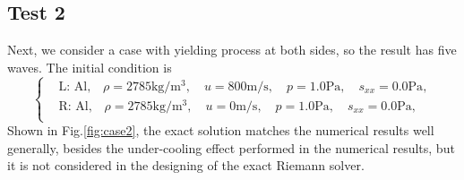 \documentclass{article}
\numberwithin{equation}{section}
\numberwithin{table}{section}
\begin{document}
\subsection{Test 2}
Next, we consider a case with yielding process at both sides, so the result has five waves. The initial condition is
\begin{equation}
 \left\{ \begin{aligned}
	 &	 \text{L: Al,}\quad  \rho = 2785 \text{kg}/\text{m}^3, \quad  u = 800\text{m}/\text{s}, \quad  p = 1.0\text{Pa}, \quad  s_{xx}=0.0 \text{Pa},\\
&	 \text{R: Al,}\quad  \rho = 2785 \text{kg}/\text{m}^3, \quad  u = 0\text{m}/\text{s}, \quad  p = 1.0\text{Pa}, \quad  s_{xx}=0.0 \text{Pa},\\
   \end{aligned}
 \right.
\end{equation}
Shown in Fig.\ref{fig:case2}, the exact solution matches the numerical results well generally, besides the under-cooling effect performed in the numerical results, but it is not considered in the designing of the exact Riemann solver.
\end{document}
